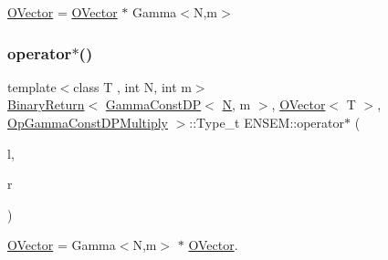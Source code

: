 \mbox{\hyperlink{classENSEM_1_1OVector}{O\+Vector}} = \mbox{\hyperlink{classENSEM_1_1OVector}{O\+Vector}} $\ast$ Gamma$<$\+N,m$>$ 

\mbox{\label{group__obsvector_gaa96dcdea35ea89a0405ab2273dfaa9a9}} 
\subsubsection{\texorpdfstring{operator$\ast$()}{operator*()}\hspace{0.1cm}{\footnotesize\ttfamily [7/8]}}
{\footnotesize\ttfamily template$<$class T , int N, int m$>$ \\
\mbox{\hyperlink{structENSEM_1_1BinaryReturn}{Binary\+Return}}$<$ \mbox{\hyperlink{classENSEM_1_1GammaConstDP}{Gamma\+Const\+DP}}$<$ \mbox{\hyperlink{operator__name__util_8cc_a7722c8ecbb62d99aee7ce68b1752f337}{N}}, m $>$, \mbox{\hyperlink{classENSEM_1_1OVector}{O\+Vector}}$<$ T $>$, \mbox{\hyperlink{structENSEM_1_1OpGammaConstDPMultiply}{Op\+Gamma\+Const\+D\+P\+Multiply}} $>$\+::Type\+\_\+t E\+N\+S\+E\+M\+::operator$\ast$ (\begin{DoxyParamCaption}\item[{const \mbox{\hyperlink{classENSEM_1_1GammaConstDP}{Gamma\+Const\+DP}}$<$ \mbox{\hyperlink{operator__name__util_8cc_a7722c8ecbb62d99aee7ce68b1752f337}{N}}, m $>$ \&}]{l,  }\item[{const \mbox{\hyperlink{classENSEM_1_1OVector}{O\+Vector}}$<$ T $>$ \&}]{r }\end{DoxyParamCaption})\hspace{0.3cm}{\ttfamily [inline]}}



\mbox{\hyperlink{classENSEM_1_1OVector}{O\+Vector}} = Gamma$<$\+N,m$>$ $\ast$ \mbox{\hyperlink{classENSEM_1_1OVector}{O\+Vector}}. 

\mbox{\label{group__obsvector_ga5641b8f1bc373f5f46ec47d9b0640c64}} 
